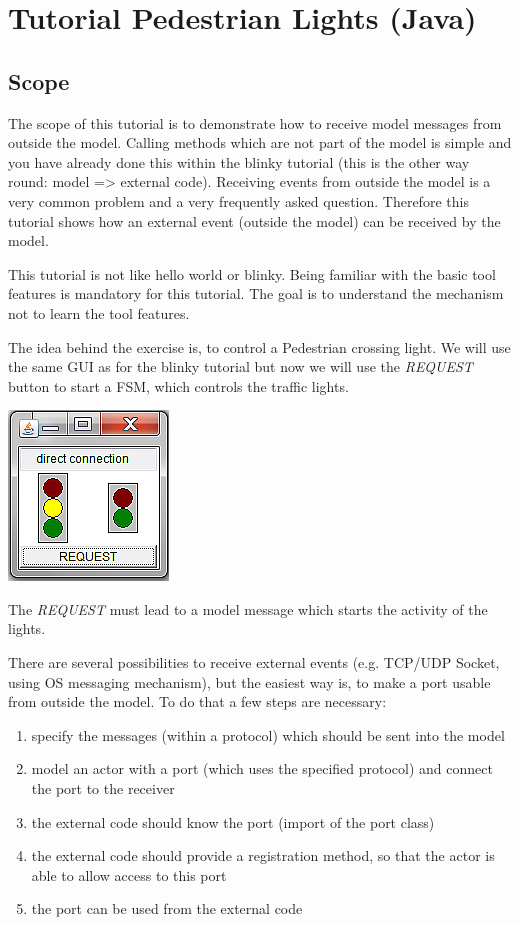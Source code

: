 \chapter{Tutorial Pedestrian Lights (Java)}

\section{Scope}

The scope of this tutorial is to demonstrate how to receive model messages from outside the model. Calling 
methods which are not part of the model is simple and you have already done this within the blinky 
tutorial (this is the other way round: model => external code). Receiving events from outside the model is 
a very common problem and a very frequently asked question. Therefore this tutorial shows how an external 
event (outside the model) can be received by the model.

This tutorial is not like hello world or blinky. Being familiar with the basic tool features is mandatory 
for this tutorial. The goal is to understand the mechanism not to learn the tool features.

The idea behind the exercise is, to control a Pedestrian crossing light. We will use the same GUI as for 
the blinky tutorial but now we will use the \textit{REQUEST} button to start a FSM, which controls the 
traffic lights.

\includegraphics{images/020-Blinky08.png}

The \textit{REQUEST} must lead to a model message which starts the activity of the lights.

There are several possibilities to receive external events (e.g. TCP/UDP Socket, using OS messaging 
mechanism), but the easiest way is, to make a port usable from outside the model. To do that a few steps 
are necessary:
\begin{enumerate}
\item specify the messages (within a protocol) which should be sent into the model
\item model an actor with a port (which uses the specified protocol) and connect the port to the receiver 
\item the external code should know the port (import of the port class)
\item the external code should provide a registration method, so that the actor is able to allow access to 
this port
\item the port can be used from the external code
\end{enumerate}

